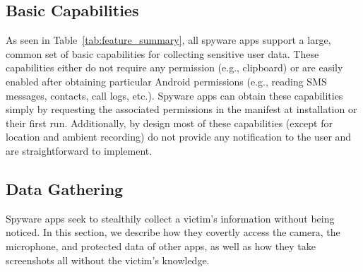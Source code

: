 \documentclass[sigconf,balance=false]{acmart}
\newcommand{\alex}[1]{\textcolor{chicagomaroon}{\noindent[AL: #1]}}
\newcommand{\alex}[1]{}
\begin{document}





\subsection{Basic Capabilities}
\label{subsec:features_enabled_by_permission}
As seen in Table~\ref{tab:feature_summary}, all spyware apps support a large, common set of basic capabilities for collecting sensitive user data.
These capabilities either do not require any permission (e.g., clipboard) or are easily enabled after obtaining particular Android permissions (e.g., reading SMS messages, contacts, call logs, etc.). Spyware apps can obtain these capabilities simply by
requesting the associated permissions in the manifest at installation or their first run.
Additionally, by design most of these capabilities
(except for location and ambient recording) do not provide any notification to
the user and are straightforward to implement.


\subsection{Data Gathering}
\label{subsec:data_gathering}
Spyware apps seek to stealthily collect a victim's information without being noticed. In this section, we describe how they covertly access the camera, the microphone, and protected data of other apps, as well as how they take screenshots all without the victim's knowledge.
\end{document}
